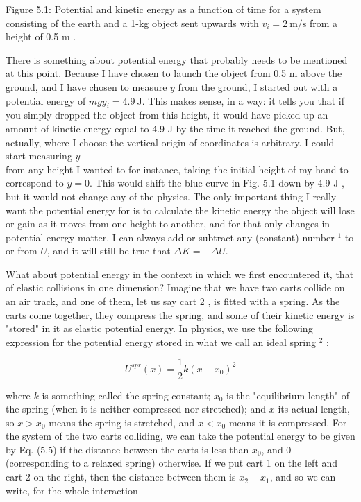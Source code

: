 \documentclass[10pt]{article}
\begin{document}
Figure 5.1: Potential and kinetic energy as a function of time for a system consisting of the earth and a 1-kg object sent upwards with $v_{i}=2 \mathrm{~m} / \mathrm{s}$ from a height of 0.5 m .

There is something about potential energy that probably needs to be mentioned at this point. Because I have chosen to launch the object from 0.5 m above the ground, and I have chosen to measure $y$ from the ground, I started out with a potential energy of $m g y_{i}=4.9 \mathrm{~J}$. This makes sense, in a way: it tells you that if you simply dropped the object from this height, it would have picked up an amount of kinetic energy equal to 4.9 J by the time it reached the ground. But, actually, where I choose the vertical origin of coordinates is arbitrary. I could start measuring $y$\\
from any height I wanted to-for instance, taking the initial height of my hand to correspond to $y=0$. This would shift the blue curve in Fig. 5.1 down by 4.9 J , but it would not change any of the physics. The only important thing I really want the potential energy for is to calculate the kinetic energy the object will lose or gain as it moves from one height to another, and for that only changes in potential energy matter. I can always add or subtract any (constant) number ${ }^{1}$ to or from $U$, and it will still be true that $\Delta K=-\Delta U$.

What about potential energy in the context in which we first encountered it, that of elastic collisions in one dimension? Imagine that we have two carts collide on an air track, and one of them, let us say cart 2 , is fitted with a spring. As the carts come together, they compress the spring, and some of their kinetic energy is "stored" in it as elastic potential energy. In physics, we use the following expression for the potential energy stored in what we call an ideal spring ${ }^{2}$ :


\begin{equation*}
U^{s p r}(x)=\frac{1}{2} k\left(x-x_{0}\right)^{2} \tag{5.5}
\end{equation*}


where $k$ is something called the spring constant; $x_{0}$ is the "equilibrium length" of the spring (when it is neither compressed nor stretched); and $x$ its actual length, so $x>x_{0}$ means the spring is stretched, and $x<x_{0}$ means it is compressed. For the system of the two carts colliding, we can take the potential energy to be given by Eq. (5.5) if the distance between the carts is less than $x_{0}$, and 0 (corresponding to a relaxed spring) otherwise. If we put cart 1 on the left and cart 2 on the right, then the distance between them is $x_{2}-x_{1}$, and so we can write, for the whole interaction
\end{document}
